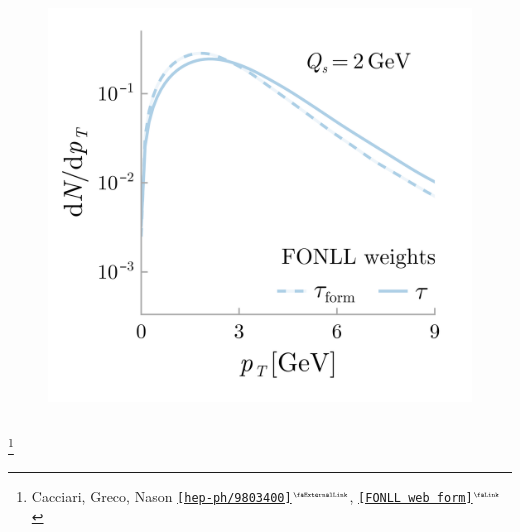 \documentclass[aspectratio=169,11pt,usenames,dvipsnames]{beamer}
\renewcommand{\thefootnote}{\color{customblue}\faPaperPlaneO}
\newcommand\blfootnote[1]{%
  \begingroup
  \renewcommand\thefootnote{}\footnote{#1}%
  \addtocounter{footnote}{-1}%
  \endgroup
}
\begin{document}
\begin{frame}
\begin{columns}[onlytextwidth,t]
\begin{center}
        \vspace{-13pt}
        \begin{figure}
            \centering
            \includegraphics[height=0.63\textheight]{images/final_sketch_raa_gl_fonll_v4_fonll.png}
        \end{figure}

       \end{center}
    \end{columns}

    \blfootnote{\scriptsize Cacciari, Greco, Nason \href{https://arxiv.org/abs/hep-ph/9803400}{{\color{palgold}\texttt{[hep-ph/9803400]$^\text{\tiny\faExternalLink}$}}}, \href{https://www.lpthe.jussieu.fr/~cacciari/fonll/fonllform.html}{{\color{raablue}\texttt{[FONLL web form]$^\text{\tiny\faLink}$}}}}
\end{frame}

\end{document}
